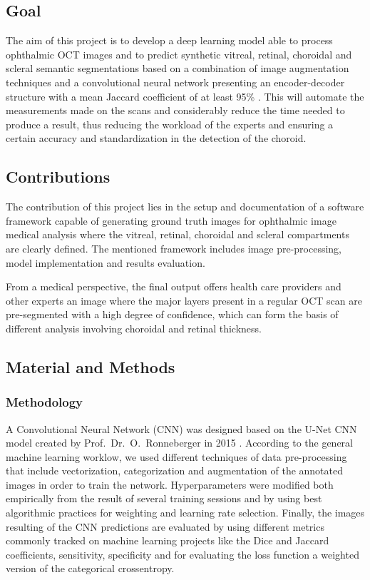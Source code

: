 \documentclass[12pt,a4paper]{scrartcl}
\begin{document}
\subsection{Goal}
The aim of this project is to develop a deep learning model able to process  ophthalmic  OCT  images  and to predict  synthetic  vitreal,  retinal,  choroidal  and  scleral  semantic  segmentations  based  on  a  combination  of  image  augmentation  techniques  and  a convolutional neural network presenting an encoder-decoder structure with a mean Jaccard coefficient of at least 95\%   \cite{Maloca2019}. This will automate the measurements made on the scans and considerably reduce the time needed to produce a result, thus reducing the workload of the experts and ensuring a certain accuracy and standardization in the detection of the choroid. 

\subsection{Contributions}

The contribution of this project lies in the setup and documentation of a software framework capable of generating ground truth images for ophthalmic image medical analysis where the vitreal, retinal, choroidal and scleral compartments are clearly defined. The mentioned framework includes image pre-processing, model implementation and results evaluation. 

From a medical perspective, the final output offers health care providers and other experts an image where the major layers present in a regular OCT scan are pre-segmented with a high degree of confidence, which can form the basis of different analysis involving choroidal and retinal thickness. 

\subsection{Material and Methods}

\subsubsection{Methodology}

A Convolutional Neural Network (CNN) was designed based on the U-Net CNN model created by Prof.~Dr.~O.~Ronneberger in 2015 \cite{Ronneberger2015}. According to the general machine learning worklow, we used different techniques of data pre-processing that include vectorization, categorization and augmentation of the annotated images in order to train the network. Hyperparameters were modified both empirically from the result of several training sessions and by using best algorithmic practices for weighting and learning rate selection. Finally, the images resulting of the CNN predictions are evaluated by using different metrics commonly tracked on machine learning projects like the Dice and Jaccard coefficients, sensitivity, specificity and for evaluating the loss function a weighted version of the categorical crossentropy. 
\end{document}

